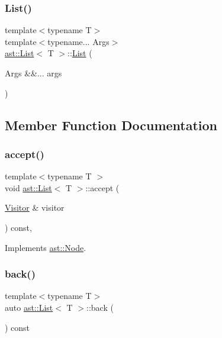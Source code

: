 \subsubsection{\texorpdfstring{List()}{List()}}
{\footnotesize\ttfamily template$<$typename T$>$ \\
template$<$typename... Args$>$ \\
\hyperlink{structast_1_1_list}{ast\+::\+List}$<$ T $>$\+::\hyperlink{structast_1_1_list}{List} (\begin{DoxyParamCaption}\item[{Args \&\&...}]{args }\end{DoxyParamCaption})\hspace{0.3cm}{\ttfamily [inline]}}



\subsection{Member Function Documentation}
\mbox{\label{structast_1_1_list_ae0c4326fcf0cdf57edff409947e98f3a}} 
\subsubsection{\texorpdfstring{accept()}{accept()}}
{\footnotesize\ttfamily template$<$typename T $>$ \\
void \hyperlink{structast_1_1_list}{ast\+::\+List}$<$ T $>$\+::accept (\begin{DoxyParamCaption}\item[{\hyperlink{structast_1_1_visitor}{Visitor} \&}]{visitor }\end{DoxyParamCaption}) const\hspace{0.3cm}{\ttfamily [override]}, {\ttfamily [virtual]}}



Implements \hyperlink{structast_1_1_node_abc089ee6caaf06a4445ebdd8391fdebc}{ast\+::\+Node}.

\mbox{\label{structast_1_1_list_ae66fbd29bbd24c437ff03f803bdc028a}} 
\subsubsection{\texorpdfstring{back()}{back()}}
{\footnotesize\ttfamily template$<$typename T$>$ \\
auto \hyperlink{structast_1_1_list}{ast\+::\+List}$<$ T $>$\+::back (\begin{DoxyParamCaption}{ }\end{DoxyParamCaption}) const\hspace{0.3cm}{\ttfamily [inline]}}

